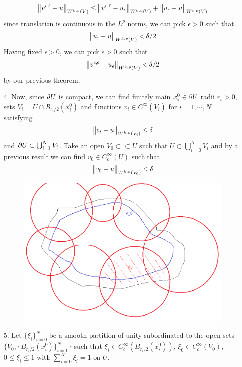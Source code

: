 \documentclass[10pt,a4paper]{report}
\newenvironment{proof}
{\begin{changemargin}{1cm}{0.5cm} 
	}%
	{\end{changemargin}
}
\begin{document}
\begin{proof}
\begin{itemize}
\begin{align*}
\bigl\lVert v^{\epsilon,\tilde{\epsilon}}-u\bigr\rVert_{W^{k,p}(V)} \leq \bigl\lVert v^{\epsilon,\tilde{\epsilon}}-u_{\epsilon}\bigr\rVert_{W^{k,p}(V)} + \bigl\lVert u_{\epsilon}-u\bigr\rVert_{W^{k,p}(V)}
\end{align*}
since translation is continuous in the $L^p$ norms, we can pick $\epsilon >0$ such that
\begin{align*}
\bigl\lVert u_{\epsilon}-u\bigr\rVert_{W^{k,p}(V)} < \delta /2
\end{align*}
Having fixed $\epsilon>0$, we can pick $\tilde{\epsilon}>0$ such that
\begin{align*}
\bigl\lVert v^{\epsilon,\tilde{\epsilon}}-u_{\epsilon}\bigr\rVert_{W^{k,p}(V)} < \delta /2
\end{align*}
by our previous theorem.
\item[4.] Now, since $\partial U$ is compact, we can find finitely main $x^0_i \in \partial U$ radii $r_i>0$, sets $V_i = U \cap B_{r_i /2}(x^0_i)$ and functions $v_i \in C^{\infty}(\bar{V}_i)$ for $i=1,\cdots,N$ satisfying
\begin{align*}
\bigl\lVert v_i - u\bigr\rVert_{W^{k,p}(V_i)} \leq \delta
\end{align*}
and $\partial U \subset \bigcup_{i=1}^N V_i$. Take an open $V_0 \subset \subset U$ such that $U \subset \bigcup_{i=0}^N V_i$ and by a previous result we can find $v_0 \in C^{\infty}_c(U)$ such that
\begin{align*}
\bigl\lVert v_0-u\bigr\rVert_{W^{k,p}(V_0)} \leq \delta
\end{align*}
\begin{figure}[h]
	\centering
	\includegraphics[scale=0.5]{4}
\end{figure}
\item[5.] Let $\{\xi_i\}_{i=0}^N$ be a smooth partition of unity subordinated to the open sets $\{V_0, \{B_{r_i/2}(x^0_i)\}_{i=1}^N \}$ such that $\xi_i \in C^{\infty}_c(B_{r_i/2}(x_i^0))$, $\xi_0 \in C_c^{\infty}(V_0)$, $0 \leq \xi_i \leq 1$ with $\sum_{i=0}^N \xi_i =1$ on $U$.


\end{itemize}
\end{proof}
\end{document}
